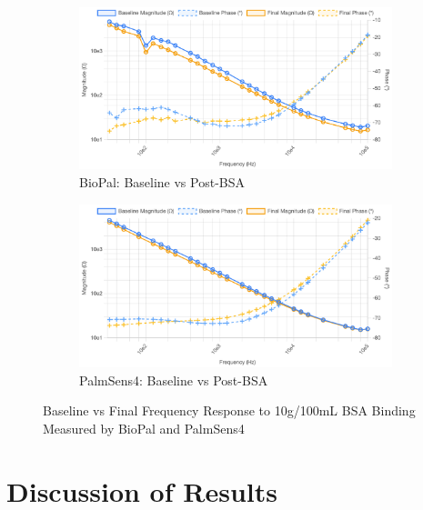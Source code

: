 \begin{figure}[H]
    \centering
    \begin{subfigure}{0.48\textwidth}
        \includegraphics[width=\textwidth]{10g-100mL BioPal.png}   
        \caption{BioPal: Baseline vs Post-BSA}
        \label{fig:10g_biopal}
    \end{subfigure}
    \hfill
    \begin{subfigure}{0.48\textwidth}
        \includegraphics[width=\textwidth]{PalmSens10g.png}
        \caption{PalmSens4: Baseline vs Post-BSA}
        \label{fig:10g_palmsens}
    \end{subfigure}
    \caption{Baseline vs Final Frequency Response to 10g/100mL BSA Binding Measured by BioPal and PalmSens4}
    \label{fig:10g_bsa_comparison_final}
\end{figure}

\section{Discussion of Results}


